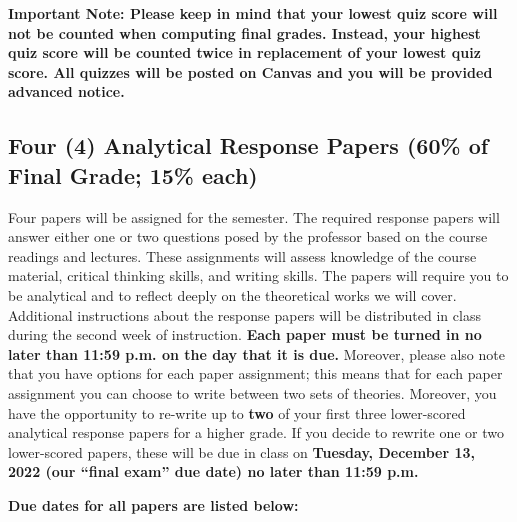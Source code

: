 \documentclass[11pt,]{article}
\begin{document}
\textbf{Important Note: Please keep in mind that your lowest quiz score
will not be counted when computing final grades. Instead, your highest
quiz score will be counted twice in replacement of your lowest quiz
score. All quizzes will be posted on Canvas and you will be provided
advanced notice.}

\hypertarget{writing_assignments}{%
\subsection{Four (4) Analytical Response Papers (60\% of Final Grade;
15\% each)}\label{writing_assignments}}

Four papers will be assigned for the semester. The required response
papers will answer either one or two questions posed by the professor
based on the course readings and lectures. These assignments will assess
knowledge of the course material, critical thinking skills, and writing
skills. The papers will require you to be analytical and to reflect
deeply on the theoretical works we will cover. Additional instructions
about the response papers will be distributed in class during the second
week of instruction. \textbf{Each paper must be turned in no later than
11:59 p.m. on the day that it is due.} Moreover, please also note that
you have options for each paper assignment; this means that for each
paper assignment you can choose to write between two sets of theories.
Moreover, you have the opportunity to re-write up to \textbf{two} of
your first three lower-scored analytical response papers for a higher
grade. If you decide to rewrite one or two lower-scored papers, these
will be due in class on \textbf{Tuesday, December 13, 2022 (our ``final
exam'' due date) no later than 11:59 p.m.}

\textbf{Due dates for all papers are listed below:}

\renewcommand{\arraystretch}{1.25}
\end{document}
